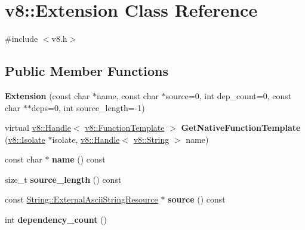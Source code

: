\hypertarget{classv8_1_1_extension}{}\section{v8\+:\+:Extension Class Reference}
\label{classv8_1_1_extension}


{\ttfamily \#include $<$v8.\+h$>$}

\subsection*{Public Member Functions}
\begin{DoxyCompactItemize}
\item 
\hypertarget{classv8_1_1_extension_a10868673b7801cc1139ca3bc09bcfcf6}{}{\bfseries Extension} (const char $\ast$name, const char $\ast$source=0, int dep\+\_\+count=0, const char $\ast$$\ast$deps=0, int source\+\_\+length=-\/1)\label{classv8_1_1_extension_a10868673b7801cc1139ca3bc09bcfcf6}

\item 
\hypertarget{classv8_1_1_extension_acd2dc16a3afa2ec737e9bc9adea977be}{}virtual \hyperlink{classv8_1_1_handle}{v8\+::\+Handle}$<$ \hyperlink{classv8_1_1_function_template}{v8\+::\+Function\+Template} $>$ {\bfseries Get\+Native\+Function\+Template} (\hyperlink{classv8_1_1_isolate}{v8\+::\+Isolate} $\ast$isolate, \hyperlink{classv8_1_1_handle}{v8\+::\+Handle}$<$ \hyperlink{classv8_1_1_string}{v8\+::\+String} $>$ name)\label{classv8_1_1_extension_acd2dc16a3afa2ec737e9bc9adea977be}

\item 
\hypertarget{classv8_1_1_extension_a183946edbf28789f7cddecdad2d26f96}{}const char $\ast$ {\bfseries name} () const \label{classv8_1_1_extension_a183946edbf28789f7cddecdad2d26f96}

\item 
\hypertarget{classv8_1_1_extension_a91da6067f79c5c354aa3184ed0746966}{}size\+\_\+t {\bfseries source\+\_\+length} () const \label{classv8_1_1_extension_a91da6067f79c5c354aa3184ed0746966}

\item 
\hypertarget{classv8_1_1_extension_a97aa9a425f31d453161540e37c19c0ce}{}const \hyperlink{classv8_1_1_string_1_1_external_ascii_string_resource}{String\+::\+External\+Ascii\+String\+Resource} $\ast$ {\bfseries source} () const \label{classv8_1_1_extension_a97aa9a425f31d453161540e37c19c0ce}

\item 
\hypertarget{classv8_1_1_extension_a7623b08e3bc42d903bd923a00317b7f9}{}int {\bfseries dependency\+\_\+count} ()\label{classv8_1_1_extension_a7623b08e3bc42d903bd923a00317b7f9}


\end{DoxyCompactItemize}
